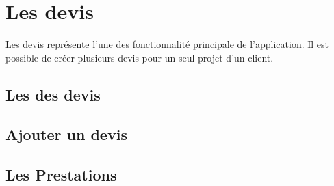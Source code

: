 \chapter{Les devis}
Les devis représente l'une des fonctionnalité principale de l'application. Il est possible de créer plusieurs devis pour un seul projet d'un client. 
\section{Les des devis}

\section{Ajouter un devis}

\section{Les Prestations}
